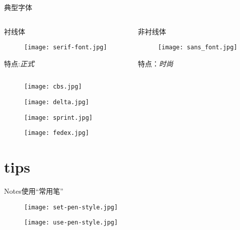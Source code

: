 ﻿\documentclass[hyperref={bookmarks=true},xcolor=pdflatex,svgnames,table,compress]{beamer}
\begin{document}
\begin{frame}{典型字体}

  \begin{columns}[c]

    \begin{column}{0.5\textwidth}

      衬线体

      \begin{figure}
        \texttt{[image: serif-font.jpg]}
      \end{figure}

    特点:{\itshape 正式}
    \end{column}


    \begin{column}{0.5\textwidth}

      非衬线体

      \begin{figure}
        \texttt{[image: sans\_font.jpg]}
      \end{figure}
    特点：{\itshape 时尚}
    \end{column}


  \end{columns}


\end{frame}

\begin{frame}{}
  \begin{figure}
    \texttt{[image: cbs.jpg]}
  \end{figure}
  \begin{figure}
    \texttt{[image: delta.jpg]}
  \end{figure}
\end{frame}

\begin{frame}{}
  
  \begin{figure}
    \texttt{[image: sprint.jpg]}
  \end{figure}
  \begin{figure}
    \texttt{[image: fedex.jpg]}
  \end{figure}

\end{frame}

\section{tips}
\begin{frame}{Notes使用``常用笔''}

  \begin{figure}
    \texttt{[image: set-pen-style.jpg]}
  \end{figure}

  \begin{figure}
    \texttt{[image: use-pen-style.jpg]}
  \end{figure}

\end{frame}
\end{document}
